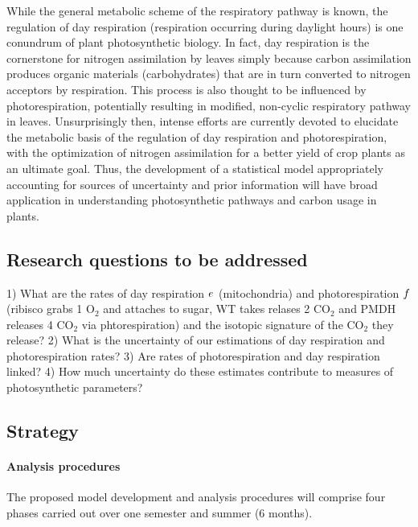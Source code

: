While the general metabolic scheme of the respiratory pathway is known, the
  regulation of day respiration (respiration occurring during daylight hours) is
  one conundrum of plant photosynthetic biology.
In fact, day respiration is the cornerstone for nitrogen assimilation by leaves simply
  because carbon assimilation produces organic materials (carbohydrates)
  that are in turn converted to nitrogen acceptors by respiration.
This process is also thought to be influenced by photorespiration,
  potentially resulting in modified, non-cyclic respiratory pathway in leaves.
Unsurprisingly then, intense efforts are currently devoted to elucidate the
  metabolic basis of the regulation of day respiration and photorespiration,
  with the optimization of nitrogen assimilation for a better
  yield of crop plants as an ultimate goal.
Thus, the development of a statistical model appropriately accounting for
  sources of uncertainty and prior information
  will have broad application in understanding photosynthetic pathways
  and carbon usage in plants.


\subsection{Research questions to be addressed}

1) What are the rates of day
  respiration $e_{}$ (mitochondria) and
  photorespiration $f_{}$ (ribisco grabs 1 O$_2$ and attaches to sugar,
    WT takes relases 2 CO$_2$ and PMDH releases 4 CO$_2$ via phtorespiration)
    and the isotopic signature of the CO$_2$ they release?
2) What is the uncertainty of our estimations of day respiration and photorespiration rates?
3) Are rates of photorespiration and day respiration linked?
4) How much uncertainty do these estimates contribute to measures of photosynthetic parameters?

\subsection{Strategy}

\paragraph{Analysis procedures}

The proposed model development and analysis procedures will comprise
  four phases carried out over one semester and summer (6 months).

